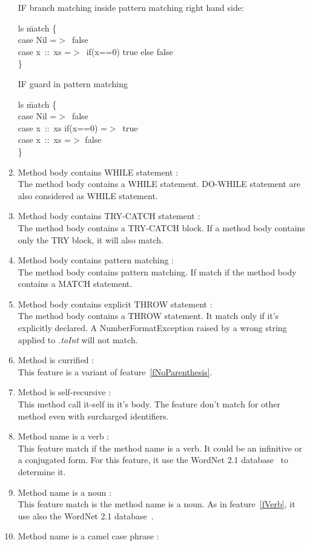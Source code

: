 \documentclass[12pt]{article}
\newcommand{\code}[1]{{\fontfamily{phv}\selectfont \begin{tabbing} #1 \end{tabbing}}}
\begin{document}
\begin{enumerate}
IF branch matching inside pattern matching right hand side:
\code{
ls \=match \{\\
\>case Nil =$>$\ false\\
\>case x\ ::\ xs =$>$\ if(x==0) true else false\\
\}
}
IF guard in pattern matching
\code{
ls \=match \{\\
\>case Nil =$>$\ false\\
\>case x\ ::\ xs if(x==0) =$>$\ true\\
\>case x\ ::\ xs =$>$ false\\
\}
}
\item Method body contains WHILE statement :\\
	The method body contains a WHILE statement. DO-WHILE statement are also considered as WHILE statement.
\item Method body contains TRY-CATCH statement :\\
	The method body contains a TRY-CATCH block. If a method body contains only the TRY block, it will also match.
\item Method body contains pattern matching : \\
	The method body contains pattern matching. If match if the method body contains a MATCH statement.
\item Method body contains explicit THROW statement :\\
	The method body contains a THROW statement. It match only if it's explicitly declared. A NumberFormatException raised by a wrong string applied to \textit{.toInt} will not match.
\item Method is currified : \\
	This feature is a variant of feature~\ref{fNoParenthesis}.
\item Method is self-recursive : \\
	This method call it-self in it's body. The feature don't match for other method even with surcharged identifiers.
\item Method name is a verb : \label{fVerb}\\
	This feature match if the method name is a verb. It could be an infinitive or a conjugated form. For this feature, it use the WordNet 2.1 database~\cite{wordNet} to determine it.
\item Method name is a noun :\\
	This feature match is the method name is a noun. As in feature~\ref{fVerb}, it use also the WordNet 2.1 database~\cite{wordNet}.
\item Method name is a camel case phrase : \label{fCamel}\\

\end{enumerate}
\end{document}
